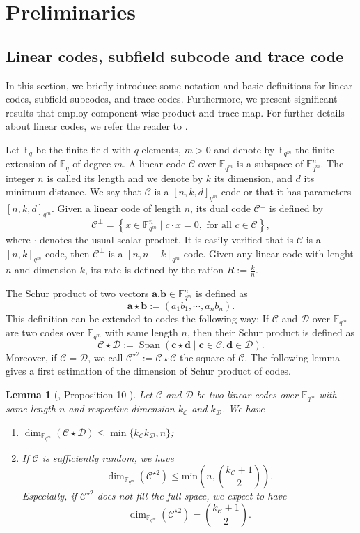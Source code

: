 \documentclass[a4paper]{article}
\newtheorem{lemma}[thm]{Lemma}
\theoremstyle{definition}
\theoremstyle{remark}
\newcommand{\calC}{\mathcal{C}}
\newcommand{\calD}{\mathcal{D}}
\newcommand{\fqm}{\mathbb{F}_{q^m}}
\newcommand{\fq}{\mathbb{F}_{q}}
\newcommand{\Span}[1]{\operatorname{Span}\left(#1\right)}
\newcommand\TODO[1]{\textcolor{red}{TO DO: #1}}
\begin{document}
\section{Preliminaries}

\subsection{Linear codes, subfield subcode and trace code}


In this section, we briefly introduce some notation and basic definitions for linear codes, subfield subcodes, and trace codes. Furthermore, we present significant results that employ component-wise product and trace map. For further details about linear codes, we refer the reader to \cite{MS86}.

\noindent Let $\fq$ be the finite field with $q$ elements, $m > 0$ and denote  by $\fqm$ the finite extension of $\fq$ of degree $m$. A linear code $\calC$ over $\fqm$ is a subspace of $\fqm^n$. The integer $n$ is called its length and we denote by $k$ its dimension, and $d$ its minimum distance. We say that $\calC$ is a $[n,k,d]_{q^m}$ code or that it has parameters $[n,k,d]_{q^m}$. Given a linear code of length $n$, its dual code $\calC^{\perp}$ is defined by 
\[\calC^{\perp}=\left\lbrace x \in \fqm^n \mid c \cdot x=0, \text{ for all } c \in \calC \right\rbrace,\]  
where $\cdot$ denotes the usual scalar product. It is easily verified that is $\calC$ is a $[n,k]_{q^m}$ code, then $\calC^{\perp}$ is a $[n,n-k]_{q^m}$ code.
Given any linear code with lenght $n$ and dimension $k$, its rate is defined by the ration $R := \frac{k}{n}$.

\noindent The Schur product of two vectors $\mathbf{a}$,$\mathbf{b} \in \fqm^n$ is defined as 
\[ \mathbf{a} \star \mathbf{b} := (a_1b_1,\cdots,a_nb_n). \]
This definition can be extended to codes the following way: If $\calC$ and $\calD$ over $\fqm$ are two codes over $\fqm$ with same length $n$, then their Schur product is defined as
\[ \calC \star \calD := \Span{\mathbf{c} \star \mathbf{d} \mid \mathbf{c} \in \calC, \mathbf{d} \in \calD}. \]
Moreover, if $\calC = \calD$, we call $\calC^{\star 2} := \calC \star \calC$ the square of $\calC$. The following lemma gives a first estimation of the dimension of Schur product of codes.

\begin{lemma}[\cite{MT21}, Proposition 10 ] \label{lem:known_bounds}
Let $\calC$ and $\calD$ be two linear codes over $\fqm$ with same length $n$ and respective dimension $k_{\calC}$ and $k_{\calD}$. We have
\begin{enumerate}
	\item $\dim_{\fqm}(\calC \star \calD) \leq \min\{k_{\calC}k_{\calD},n\}$;
	\item If $\calC$ is sufficiently random, we have
\[ \dim_{\mathbb{F}_{q^m}}(\calC^{\star2}) \leq \mathrm{min}\left(n,\binom{k_{\calC}+1}{2}\right) . \]
Especially, if $\calC^{\star2}$ does not fill the full space, we expect to have 
	\[ \dim_{\fqm}(\calC^{\star2}) = \binom{k_{\calC}+1}{2}.\]
	\end{enumerate}
\end{lemma}
\end{document}

